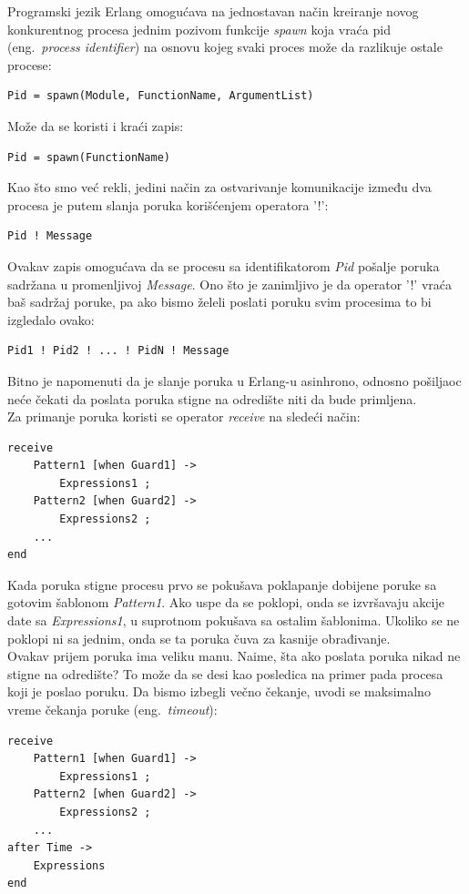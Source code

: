\documentclass[a4paper]{article}
\begin{document}
{%

Programski jezik Erlang omogućava na jednostavan način kreiranje novog konkurentnog procesa jednim pozivom funkcije {\em spawn} koja vraća pid (eng.~{\em process identifier}) na osnovu kojeg svaki proces može da razlikuje ostale procese:
\begin{verbatim}
Pid = spawn(Module, FunctionName, ArgumentList) 
\end{verbatim}
Može da se koristi i kraći zapis:
\begin{verbatim}
Pid = spawn(FunctionName) 
\end{verbatim}

Kao što smo već rekli, jedini način za ostvarivanje komunikacije između dva procesa je putem slanja poruka korišćenjem operatora '!': 
\begin{verbatim}
Pid ! Message 
\end{verbatim}
Ovakav zapis omogućava da se procesu sa identifikatorom {\em Pid} pošalje poruka sadržana u promenljivoj {\em Message}. Ono što je zanimljivo je da operator '!' vraća baš sadržaj poruke, pa ako bismo želeli poslati poruku svim procesima to bi izgledalo ovako:
\begin{verbatim}
Pid1 ! Pid2 ! ... ! PidN ! Message 
\end{verbatim} 

Bitno je napomenuti da je slanje poruka u Erlang-u asinhrono, odnosno pošiljaoc neće čekati da poslata poruka stigne na odredište niti da bude primljena. \\

Za primanje poruka koristi se operator {\em receive} na sledeći način:
\begin{verbatim}
receive
    Pattern1 [when Guard1] ->
        Expressions1 ;
    Pattern2 [when Guard2] ->
        Expressions2 ;
	... 
end
\end{verbatim}
Kada poruka stigne procesu prvo se pokušava poklapanje dobijene poruke sa gotovim šablonom 
{\em Pattern1}. Ako uspe da se poklopi, onda se izvršavaju akcije date sa {\em Expressions1}, u suprotnom pokušava sa ostalim šablonima. Ukoliko se ne poklopi ni sa jednim, onda se ta poruka čuva za kasnije obrađivanje. \\

Ovakav prijem poruka ima veliku manu. Naime, šta ako poslata poruka nikad ne stigne na odredište? To može da se desi kao posledica na primer pada procesa koji je poslao poruku. Da bismo izbegli večno čekanje, uvodi se maksimalno vreme čekanja poruke (eng.~{\em timeout}):
\begin{verbatim}
receive
    Pattern1 [when Guard1] ->
        Expressions1 ;
    Pattern2 [when Guard2] ->
        Expressions2 ;
	... 
after Time -> 
	Expressions
end
\end{verbatim}

}
\end{document}
